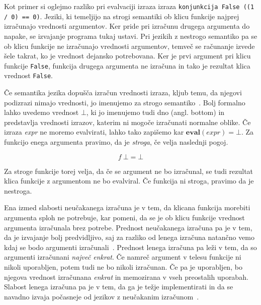 Kot primer si oglejmo razliko pri evalvaciji izraza izraza \texttt{konjunkcija False ((1 / 0) == 0)}. Jeziki, ki temeljijo na strogi semantiki ob klicu funkcije najprej izračunajo vrednosti argumentov. Ker pride pri izračunu drugega argumenta do napake, se izvajanje programa tukaj ustavi. Pri jezikih z nestrogo semantiko pa se ob klicu funkcije ne izračunajo vrednosti argumentov, temveč se računanje izvede šele takrat, ko je vrednost dejansko potrebovana. Ker je prvi argument pri klicu funkcije \texttt{False}, funkcija drugega argumenta ne izračuna in tako je rezultat klica vrednost \texttt{False}.

Če semantika jezika dopušča izračun vrednosti izraza, kljub temu, da njegovi podizrazi nimajo vrednosti, jo imenujemo za strogo semantiko~\cite{peyton1987implementation}. Bolj formalno lahko uvedemo vrednost $\bot$, ki jo imenujemo tudi dno (angl. bottom) in predstavlja vrednosti izrazov, katerim ni mogoče izračunati normalne oblike. Če izraza \textit{expr} ne moremo evalvirati, lahko tako zapišemo kar $\textbf{eval}(expr) = \bot$. Za funkcijo enega argumenta pravimo, da je \textit{stroga}, če velja naslednji pogoj.

$$ f \: \bot = \bot $$

Za stroge funkcije torej velja, da če se argument ne bo izračunal, se tudi rezultat klica funkcije z argumentom ne bo evalviral. Če funkcija ni stroga, pravimo da je nestroga.


Ena izmed slabosti neučakanega izračuna je v tem, da klicana funkcija morebiti argumenta sploh ne potrebuje, kar pomeni, da se je ob klicu funkcije vrednost argumenta izračunala brez potrebe. Prednost neučakanega izračuna pa je v tem, da je izvajanje bolj predvidljivo, saj za razliko od lenega izračuna natančno vemo kdaj se bodo argumenti izračunali~\cite{peyton1987implementation}. Prednost lenega izračuna pa leži v tem, da so argumenti izračunani \textit{največ enkrat}. Če namreč argument v telesu funkcije ni nikoli uporabljen, potem tudi ne bo nikoli izračunan. Če pa je uporabljen, bo njegova vrednost izračunana \textit{enkrat} in memozirana v vseh preostalih uporabah. Slabost lenega izračuna pa je v tem, da ga je težje implementirati in da se navadno izvaja počasneje od jezikov z neučakanim izračunom~\cite{peyton1987implementation, sebesta2004concepts}.


